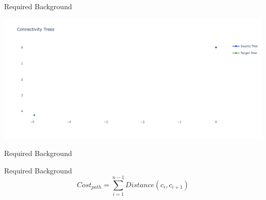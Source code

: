 

\begin{frame}[fragile]{Required Background} 
  \begin{center}
  \includegraphics[width=1.0\textwidth]{figures/required_background/rrt/rrt0}
  \end{center}
\end{frame}

\begin{frame}[fragile]{Required Background} 
\end{frame}

\begin{frame}[fragile]{Required Background} 
\[\mathit{Cost_{path}} = \sum_{i=1}^{n-1} \mathit{Distance}(c_i, c_{i+1})\]
\end{frame}


